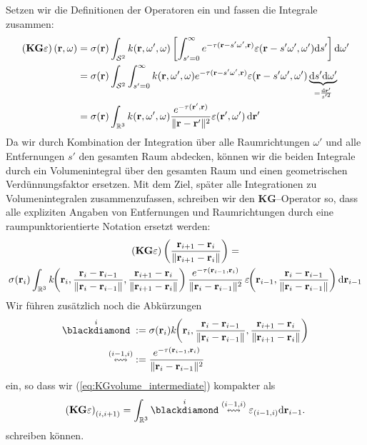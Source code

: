 	Setzen wir die Definitionen der Operatoren ein und fassen die Integrale zusammen:
	\begin{align*}
		\left(\mathbf{KG}\varepsilon\right)(\mathbf{r},\omega)&=\sigma(\mathbf{r}) \int_{\mathcal{S}^2} k(\mathbf{r},\omega',\omega)\left[\int_{s'=0}^\infty e^{-\tau(\mathbf{r}-s' \omega',\mathbf{r})}\varepsilon(\mathbf{r}-s' \omega',\omega') \text{d}s'\right] \text{d}\omega' \\
		&=\sigma(\mathbf{r}) \int_{\mathcal{S}^2} \int_{s'=0}^\infty k(\mathbf{r},\omega',\omega) e^{-\tau(\mathbf{r}-s' \omega',\mathbf{r})}\varepsilon(\mathbf{r}-s' \omega',\omega') \underbrace{\text{d}s' \text{d}\omega'}_{=\frac{\text{d}\mathbf{r}'}{s'^2}} \\
		&=\sigma(\mathbf{r}) \int_{\mathbb{R}^3} k(\mathbf{r},\omega',\omega) \frac{e^{-\tau(\mathbf{r}',\mathbf{r})}}{\|\mathbf{r}-\mathbf{r}'\|^2}\varepsilon(\mathbf{r}',\omega') \,\text{d}\mathbf{r}'
	\end{align*}
	Da wir durch Kombination der Integration über alle Raumrichtungen $\omega'$ und alle Entfernungen $s'$ den gesamten Raum abdecken, können wir die beiden Integrale durch ein Volumenintegral über den gesamten Raum und einen geometrischen Verdünnungsfaktor ersetzen. Mit dem Ziel, später alle Integrationen zu Volumenintegralen zusammenzufassen, schreiben wir den $\mathbf{KG}$--Operator so, dass alle expliziten Angaben von Entfernungen und Raumrichtungen durch eine raumpunktorientierte Notation ersetzt werden:
	\begin{multline}
		\left(\mathbf{KG}\varepsilon\right)\left(\frac{\mathbf{r}_{i+1}-\mathbf{r}_i}{\|\mathbf{r}_{i+1}-\mathbf{r}_i\|}\right)=\\
		\sigma(\mathbf{r}_i) \int_{\mathbb{R}^3} k\hspace{-1 mm}\left(\mathbf{r}_i,\frac{\mathbf{r}_i-\mathbf{r}_{i-1}}{\|\mathbf{r}_i-\mathbf{r}_{i-1}\|},\frac{\mathbf{r}_{i+1}-\mathbf{r}_i}{\|\mathbf{r}_{i+1}-\mathbf{r}_i\|}\right)\frac{e^{-\tau(\mathbf{r}_{i-1},\mathbf{r}_i)}}{\|\mathbf{r}_i-\mathbf{r}_{i-1}\|^2}\,\varepsilon\hspace{-1 mm}\left(\mathbf{r}_{i-1},\frac{\mathbf{r}_i-\mathbf{r}_{i-1}}{\|\mathbf{r}_i-\mathbf{r}_{i-1}\|}\right)\text{d}\mathbf{r}_{i-1}
		\label{eq:KGvolume_intermediate}
	\end{multline}
	Wir führen zusätzlich noch die Abkürzungen
	\begin{align*}
		\scatter{i}\;&:=\sigma(\location{r}_i)k\hspace{-1 mm}\left(\location{r}_i,\normalized{\location{r}_i-\location{r}_{i-1}},\normalized{\location{r}_{i+1}-\location{r}_i}\right)\\
		\propagate{i-1}{i}&:=\frac{e^{-\tau(\location{r}_{i-1},\location{r}_i)}}{\|\location{r}_i-\location{r}_{i-1}\|^2}
	\end{align*}
	ein, so dass wir (\ref{eq:KGvolume_intermediate}) %
	kompakter als
	\begin{equation}
		\left(\mathbf{KG}\varepsilon\right)_{(i,i+1)}=\int_{\mathbb{R}^3} \scatter{i}\propagate{i-1}{i}\varepsilon_{(i-1,i)}\text{d}\location{r}_{i-1}.
		\label{eq:KGvolume}
	\end{equation}
	schreiben können.


